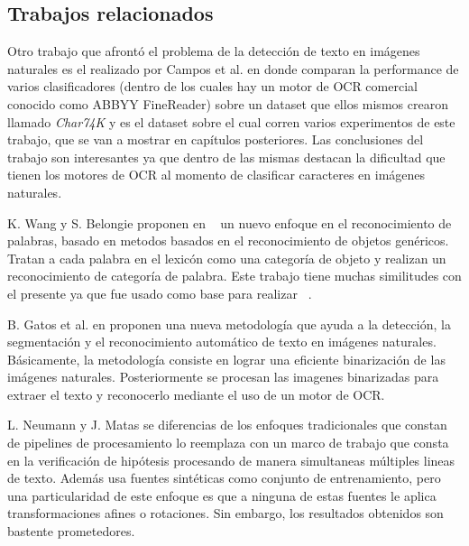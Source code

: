 \subsection{Trabajos relacionados}

	
	Otro trabajo que afrontó el problema de la detección de texto en imágenes naturales es el realizado por Campos et al. en \cite{dCBV09} donde comparan la performance de varios clasificadores (dentro de los cuales hay un motor de OCR comercial conocido como ABBYY FineReader) sobre un dataset que ellos mismos crearon llamado \textit{Char74K} y es el dataset sobre el cual corren varios experimentos de este trabajo, que se van a mostrar en capítulos posteriores. Las conclusiones del trabajo son interesantes ya que dentro de las mismas destacan la dificultad que tienen los motores de OCR al momento de clasificar caracteres en imágenes naturales.
	
	K. Wang y S. Belongie proponen en ~\cite{WangBelongie} un nuevo enfoque en el reconocimiento de palabras, basado en metodos basados en el reconocimiento de objetos genéricos. Tratan a cada palabra en el lexicón como una categoría de objeto y realizan un reconocimiento de categoría de palabra. Este trabajo tiene muchas similitudes con el presente ya que fue usado como base para realizar ~\cite{wang}.
	
	B. Gatos et al. en \cite{GPP03} proponen una nueva metodología que ayuda a la detección, la segmentación y el reconocimiento automático de texto en imágenes naturales. Básicamente, la metodología consiste en lograr una eficiente binarización de las imágenes naturales. Posteriormente se procesan las imagenes binarizadas para extraer el texto y reconocerlo mediante el uso de un motor de OCR.

	L. Neumann y J. Matas se diferencias de los enfoques tradicionales que constan de pipelines de procesamiento lo reemplaza con un marco de trabajo que consta en la verificación de hipótesis procesando de manera simultaneas múltiples lineas de texto. Además usa fuentes sintéticas como conjunto de entrenamiento, pero una particularidad de este enfoque es que a ninguna de estas fuentes le aplica transformaciones afines o rotaciones. Sin embargo, los resultados obtenidos son bastente prometedores.